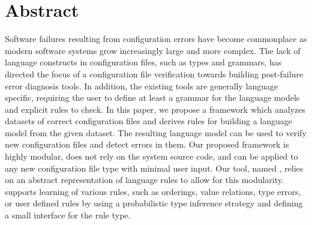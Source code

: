 
\section*{Abstract}

Software failures resulting from configuration errors 
have become commonplace as modern software systems 
grow increasingly large and more complex.
The lack of language constructs in configuration files, 
such as types and grammars, 
has directed the focus of a configuration file verification 
towards building post-failure error diagnosis tools. 
In addition, the existing tools are generally language
specific, requiring the user to define at least a grammar for the language
models and explicit rules to check. 
In this paper, we propose a framework which analyzes
datasets of correct configuration files and derives rules for building a
language model from the given dataset. 
The resulting language model can be used
to verify new configuration files and detect errors in them. 
Our proposed framework is highly modular, 
does not rely on the system source code, and
can be applied to any new configuration file type with minimal user input.  
Our tool, named \app, relies on an abstract representation of language 
rules to allow for this modularity. 
\app supports learning of various rules, such as orderings,
value relations, type errors, or user defined rules
by using a probabilistic type inference strategy and
defining a small interface for the rule type.

